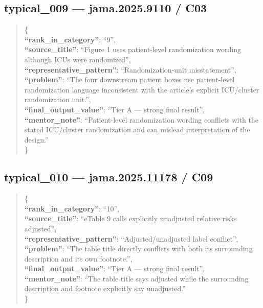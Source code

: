 \documentclass[
  letterpaper,
  9pt]{extreport}
\begin{document}
\hypertarget{typical_009--jama20259110--c03}{%
\subsection{typical\_009 --- jama.2025.9110 /
C03}\label{typical_009--jama20259110--c03}}

\begin{quote}
\{\\
\textbf{``rank\_in\_category''}: ``9'',\\
\textbf{``source\_title''}: ``Figure 1 uses patient-level randomization
wording although ICUs were randomized'',\\
\textbf{``representative\_pattern''}: ``Randomization-unit
misstatement'',\\
\textbf{``problem''}: ``The four downstream patient boxes use
patient-level randomization language inconsistent with the article's
explicit ICU/cluster randomization unit.'',\\
\textbf{``final\_output\_value''}: ``Tier A --- strong final result'',\\
\textbf{``mentor\_note''}: ``Patient-level randomization wording
conflicts with the stated ICU/cluster randomization and can mislead
interpretation of the design.''\\
\}
\end{quote}

\hypertarget{typical_010--jama202511178--c09}{%
\subsection{typical\_010 --- jama.2025.11178 /
C09}\label{typical_010--jama202511178--c09}}

\begin{quote}
\{\\
\textbf{``rank\_in\_category''}: ``10'',\\
\textbf{``source\_title''}: ``eTable 9 calls explicitly unadjusted
relative risks adjusted'',\\
\textbf{``representative\_pattern''}: ``Adjusted/unadjusted label
conflict'',\\
\textbf{``problem''}: ``The table title directly conflicts with both its
surrounding description and its own footnote.'',\\
\textbf{``final\_output\_value''}: ``Tier A --- strong final result'',\\
\textbf{``mentor\_note''}: ``The table title says adjusted while the
surrounding description and footnote explicitly say unadjusted.''\\
\}
\end{quote}
\end{document}
